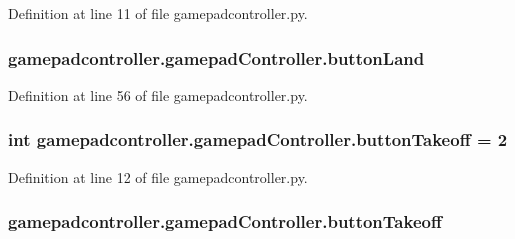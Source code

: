 Definition at line 11 of file gamepadcontroller.\-py.

\hypertarget{classgamepadcontroller_1_1gamepadController_a56184378a52735c52b4a3040e3e72f09}{
\subsubsection[{button\-Land}]{\setlength{\rightskip}{0pt plus 5cm}gamepadcontroller.\-gamepad\-Controller.\-button\-Land}}\label{classgamepadcontroller_1_1gamepadController_a56184378a52735c52b4a3040e3e72f09}


Definition at line 56 of file gamepadcontroller.\-py.

\hypertarget{classgamepadcontroller_1_1gamepadController_a2db2148491b5738f9b7e3eff5eafce2a}{
\subsubsection[{button\-Takeoff}]{\setlength{\rightskip}{0pt plus 5cm}int gamepadcontroller.\-gamepad\-Controller.\-button\-Takeoff = 2\hspace{0.3cm}{\ttfamily [static]}}}\label{classgamepadcontroller_1_1gamepadController_a2db2148491b5738f9b7e3eff5eafce2a}


Definition at line 12 of file gamepadcontroller.\-py.

\hypertarget{classgamepadcontroller_1_1gamepadController_a9b7c53bfe95d03188a100b3119a1d431}{
\subsubsection[{button\-Takeoff}]{\setlength{\rightskip}{0pt plus 5cm}gamepadcontroller.\-gamepad\-Controller.\-button\-Takeoff}}\label{classgamepadcontroller_1_1gamepadController_a9b7c53bfe95d03188a100b3119a1d431}


